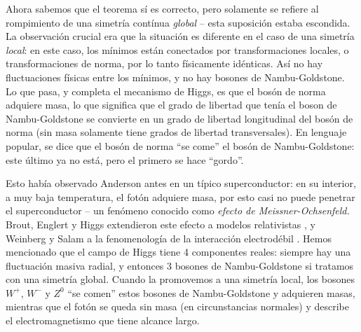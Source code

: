 Ahora sabemos que el teorema s\'i es correcto, pero solamente
se refiere al rompimiento de una simetr\'ia cont\'inua
{\em global} -- esta suposici\'on estaba escondida.
La observaci\'on crucial era que la situaci\'on es diferente
en el caso de una simetr\'ia {\em local}: en este caso, los
m\'inimos est\'an conectados por transformaciones locales, o
transformaciones de norma, por lo tanto f\'isicamente id\'enticas.
As\'i no hay fluctuaciones f\'isicas entre los m\'inimos, y no hay
bosones de Nambu-Goldstone. Lo que pasa, y completa el mecanismo
de Higgs, es que el bos\'on de norma adquiere masa, lo que significa
que el grado de libertad que ten\'ia el boson de Nambu-Goldstone
se convierte en un grado de libertad longitudinal del bos\'on de
norma (sin masa solamente tiene grados de libertad transversales).
En lenguaje popular, se dice que el bos\'on de norma ``se come''
el bos\'on de Nambu-Goldstone: este \'ultimo ya no est\'a, pero
el primero se hace ``gordo''.

Esto hab\'ia observado Anderson antes en un t\'ipico superconductor:
en su interior, a muy baja temperatura, el fot\'on adquiere masa,
por esto casi no puede penetrar el superconductor -- un fen\'omeno
conocido como {\em efecto de Meissner-Ochsenfeld.}
Brout, Englert y Higgs extendieron este efecto a modelos
relativistas \cite{EB,Higgs}, y Weinberg y Salam a la fenomenolog\'ia
de la interacci\'on electrod\'ebil \cite{Weinberg,Salam}.
Hemos mencionado que el campo de
Higgs tiene 4 componentes reales: siempre hay una fluctuaci\'on
masiva radial, y entonces 3 bosones de Nambu-Goldstone si tratamos
con una simetr\'ia global. Cuando la promovemos a una simetr\'ia
local, los bosones $W^+$, $W^-$ y $Z^0$ ``se comen'' estos
bosones de Nambu-Goldstone y adquieren masas,
mientras que el fot\'on se queda sin masa (en circunstancias
normales) y describe el electromagnetismo que tiene alcance largo.

